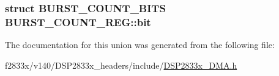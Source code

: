 \subsubsection[{bit}]{\setlength{\rightskip}{0pt plus 5cm}struct {\bf B\+U\+R\+S\+T\+\_\+\+C\+O\+U\+N\+T\+\_\+\+B\+I\+T\+S} B\+U\+R\+S\+T\+\_\+\+C\+O\+U\+N\+T\+\_\+\+R\+E\+G\+::bit}\label{union_b_u_r_s_t___c_o_u_n_t___r_e_g_abe74397af393c9ec02109b04a8039daa}


The documentation for this union was generated from the following file\+:\begin{DoxyCompactItemize}
\item 
f2833x/v140/\+D\+S\+P2833x\+\_\+headers/include/\hyperlink{_d_s_p2833x___d_m_a_8h}{D\+S\+P2833x\+\_\+\+D\+M\+A.\+h}\end{DoxyCompactItemize}

